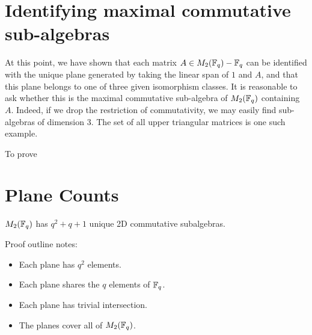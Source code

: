 \documentclass{amsart}
\begin{document}
    

\section{Identifying maximal commutative sub-algebras}

At this point, we have shown that each matrix $A \in M_2(\protect\mathbb{F}_q) - \protect\mathbb{F}_q$ can be identified with the unique plane generated by taking the linear span of $1$ and $A$, and that this plane belongs to one of three given isomorphism classes.
It is reasonable to ask whether this is the maximal commutative sub-algebra of $M_2(\protect\mathbb{F}_q)$ containing $A$. Indeed, if we drop the restriction of commutativity, we may easily find sub-algebras of dimension 3.
The set of all upper triangular matrices is one such example.

To prove 




\section{Plane Counts}

\begin{theorem}\label{total-count}
    $M_2(\protect\mathbb{F}_q)$ has $q^2 + q + 1$ unique 2D commutative subalgebras.
\end{theorem}

Proof outline notes:
\begin{itemize}
    \item Each plane has $q^2$ elements.
    \item Each plane shares the $q$ elements of $\protect\mathbb{F}_q$.
    \item Each plane has trivial intersection.
    \item The planes cover all of $M_2(\protect\mathbb{F}_q)$.
\end{itemize}
\end{document}
